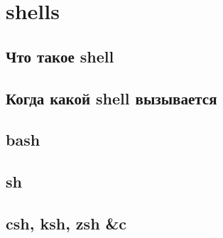 \section{shells}
\subsection{Что такое shell}
\subsection{Когда какой shell вызывается}
\subsection{bash}
\subsection{sh}
\subsection{csh, ksh, zsh \&c}
\newpage
